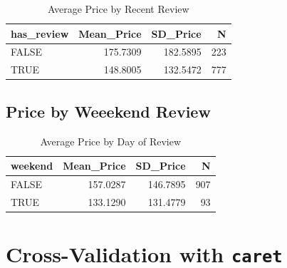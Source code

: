 \documentclass[]{book}
\newenvironment{Shaded}{\begin{snugshade}}{\end{snugshade}}
\newcommand{\KeywordTok}[1]{\textcolor[rgb]{0.13,0.29,0.53}{\textbf{#1}}}
\newcommand{\DataTypeTok}[1]{\textcolor[rgb]{0.13,0.29,0.53}{#1}}
\newcommand{\StringTok}[1]{\textcolor[rgb]{0.31,0.60,0.02}{#1}}
\newcommand{\OperatorTok}[1]{\textcolor[rgb]{0.81,0.36,0.00}{\textbf{#1}}}
\newcommand{\NormalTok}[1]{#1}
\begin{document}
\begin{table}

\caption{\label{tab:unnamed-chunk-680}Average Price by Recent Review}
\centering
\begin{tabular}[t]{l|r|r|r}
\hline
has\_review & Mean\_Price & SD\_Price & N\\
\hline
FALSE & 175.7309 & 182.5895 & 223\\
\hline
TRUE & 148.8005 & 132.5472 & 777\\
\hline
\end{tabular}
\end{table}

\subsection{Price by Weeekend Review}\label{price-by-weeekend-review}

\begin{Shaded}
\end{Shaded}

\begin{table}

\caption{\label{tab:unnamed-chunk-681}Average Price by Day of Review}
\centering
\begin{tabular}[t]{l|r|r|r}
\hline
weekend & Mean\_Price & SD\_Price & N\\
\hline
FALSE & 157.0287 & 146.7895 & 907\\
\hline
TRUE & 133.1290 & 131.4779 & 93\\
\hline
\end{tabular}
\end{table}

\section{\texorpdfstring{Cross-Validation with
\texttt{caret}}{Cross-Validation with caret}}\label{cross-validation-with-caret}
\end{document}
